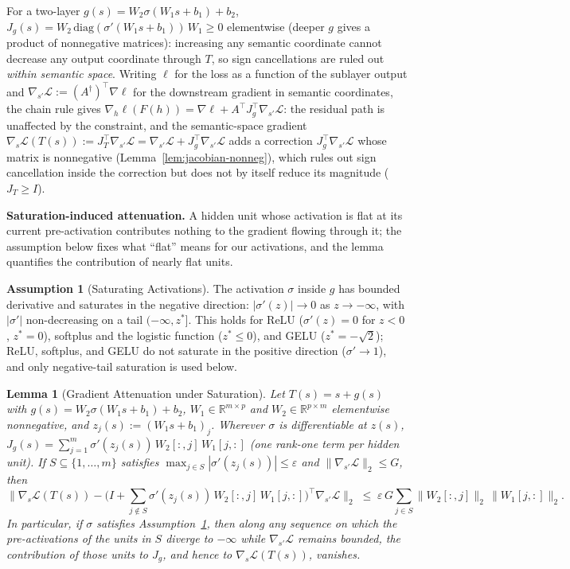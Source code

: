 \documentclass{article}
\theoremstyle{plain}
\newtheorem{lemma}[theorem]{Lemma}
\theoremstyle{definition}
\newtheorem{assumption}[theorem]{Assumption}
\theoremstyle{remark}
\theoremstyle{plain}
\begin{document}
For a two-layer $g(s)=W_2\sigma(W_1 s + b_1)+b_2$, $J_g(s)=W_2\,\mathrm{diag}(\sigma'(W_1 s+b_1))\,W_1 \ge 0$ elementwise (deeper $g$ gives a product of nonnegative matrices): increasing any semantic coordinate cannot decrease any output coordinate through $T$, so sign cancellations are ruled out \emph{within semantic space}. Writing $\ell$ for the loss as a function of the sublayer output and $\nabla_{s'}\mathcal{L} := (A^\dagger)^\top \nabla\ell$ for the downstream gradient in semantic coordinates, the chain rule gives $\nabla_h \ell(F(h)) = \nabla\ell + A^\top J_g^\top \nabla_{s'}\mathcal{L}$: the residual path is unaffected by the constraint, and the semantic-space gradient $\nabla_s\mathcal{L}(T(s)) := J_T^\top \nabla_{s'}\mathcal{L} = \nabla_{s'}\mathcal{L} + J_g^\top \nabla_{s'}\mathcal{L}$ adds a correction $J_g^\top \nabla_{s'}\mathcal{L}$ whose matrix is nonnegative (Lemma~\ref{lem:jacobian-nonneg}), which rules out sign cancellation inside the correction but does not by itself reduce its magnitude ($J_T \ge I$).

\textbf{Saturation-induced attenuation.}
A hidden unit whose activation is flat at its current pre-activation contributes nothing to the gradient flowing through it; the assumption below fixes what ``flat'' means for our activations, and the lemma quantifies the contribution of nearly flat units.

\begin{assumption}[Saturating Activations]
\label{ass:saturation}
The activation $\sigma$ inside $g$ has bounded derivative and saturates in the negative direction: $|\sigma'(z)| \to 0$ as $z\to -\infty$, with $|\sigma'|$ non-decreasing on a tail $(-\infty, z^\ast]$. This holds for ReLU ($\sigma'(z) = 0$ for $z < 0$, $z^\ast = 0$), softplus and the logistic function ($z^\ast \le 0$), and GELU ($z^\ast = -\sqrt{2}$); ReLU, softplus, and GELU do not saturate in the positive direction ($\sigma' \to 1$), and only negative-tail saturation is used below.
\end{assumption}

\begin{lemma}[Gradient Attenuation under Saturation]
\label{lem:gradient-attenuation}
Let $T(s)=s+g(s)$ with $g(s)=W_2\sigma(W_1 s+b_1)+b_2$, $W_1\in\mathbb{R}^{m\times p}$ and $W_2\in\mathbb{R}^{p\times m}$ elementwise nonnegative, and $z_j(s) := (W_1 s + b_1)_j$. Wherever $\sigma$ is differentiable at $z(s)$, $J_g(s) = \sum_{j=1}^{m} \sigma'(z_j(s))\, W_2[:,j]\, W_1[j,:]$ (one rank-one term per hidden unit). If $S \subseteq \{1,\dots,m\}$ satisfies $\max_{j\in S} |\sigma'(z_j(s))| \le \varepsilon$ and $\|\nabla_{s'}\mathcal{L}\|_2 \le G$, then
\[
\Big\| \nabla_s \mathcal{L}(T(s)) - \Big( I + \sum_{j\notin S} \sigma'(z_j(s))\, W_2[:,j]\, W_1[j,:] \Big)^{\!\top} \nabla_{s'}\mathcal{L} \Big\|_2
\;\le\; \varepsilon\, G \sum_{j\in S} \|W_2[:,j]\|_2\, \|W_1[j,:]\|_2 .
\]
In particular, if $\sigma$ satisfies Assumption~\ref{ass:saturation}, then along any sequence on which the pre-activations of the units in $S$ diverge to $-\infty$ while $\nabla_{s'}\mathcal{L}$ remains bounded, the contribution of those units to $J_g$, and hence to $\nabla_s \mathcal{L}(T(s))$, vanishes.
\end{lemma}
\end{document}
